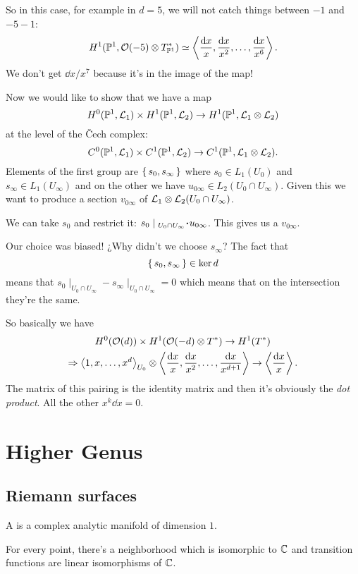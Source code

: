 \documentclass[12pt]{memoir}
\begin{document}
So in this case, for example in $d=5$, we will not catch things between $-1$ and $-5-1$:
$$H^1(\mathbb{P}^1,\mathcal{O}(-5)\otimes T^{\ast}_{\mathbb{P}^1})\simeq\left\langle \frac{\dd x}{x},\frac{\dd x}{x^2},\dots,\frac{\dd x}{x^6}\right\rangle.$$
We don't get $\dd x/x^7$ because it's in the image of the map!\par
Now we would like to show that we have a map 
$$H^0(\mathbb{P}^1,\mathcal{L}_1)\times H^1(\mathbb{P}^1,\mathcal{L}_2)\to H^1(\mathbb{P}^1,\mathcal{L}_1\otimes\mathcal{L}_2)$$
at the level of the \v{C}ech complex:
$$C^0(\mathbb{P}^1,\mathcal{L}_1)\times C^1(\mathbb{P}^1,\mathcal{L}_2)\to C^1(\mathbb{P}^1,\mathcal{L}_1\otimes\mathcal{L}_2).$$
Elements of the first group are $\{\,s_0,s_\infty\,\}$ where $s_0\in L_1(U_0)$ and $s_\infty\in L_1(U_\infty)$ and on the other we have $u_{0\infty}\in L_2(U_0\cap U_\infty)$. Given this we want to produce a section $v_{0\infty}$ of $\mathcal{L}_1\otimes\mathcal{L}_2(U_0\cap U_\infty)$.\par
We can take $s_0$ and restrict it: $s_0\mid_{U_0\cap U_\infty}\.u_{0\infty}$. This gives us a $v_{0\infty}$.\par
Our choice was biased! ¿Why didn't we choose $s_\infty$? The fact that $$\{\,s_0,s_\infty\,\}\in\ker d$$
means that $s_0\mid_{U_0\cap U_\infty}-s_\infty\mid_{U_0\cap U_\infty}=0$ which means that on the intersection they're the same.\par
So basically we have 
\begin{gather*}
H^0(\mathcal{O}(d))\times H^1(\mathcal{O}(-d)\otimes T^\ast)\to H^1(T^\ast)\\
\Rightarrow \left\langle 1,x,\dots,x^{d}\right\rangle_{U_0}\otimes\left\langle \frac{\dd x}{x},\frac{\dd x}{x^2},\dots,\frac{\dd x}{x^{d+1}}\right\rangle\to\left\langle \frac{\dd x}{x}\right\rangle.
\end{gather*}
The matrix of this pairing is the identity matrix and then it's obviously the \emph{dot product}. All the other $x^k\dd x=0$.

\chapter{Higher Genus}

\section{Riemann surfaces}

\begin{Def}
A  is a complex analytic manifold of dimension $1$. 
\end{Def}

For every point, there's a neighborhood which is isomorphic to $\mathbb{C}$ and transition functions are linear isomorphisms of $\mathbb{C}$.
\end{document}
